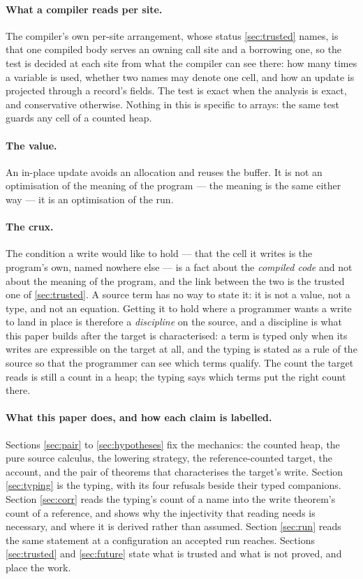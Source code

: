\documentclass[11pt,a4paper]{article}
\theoremstyle{definition}
\theoremstyle{plain}
\begin{document}
\paragraph{What a compiler reads per site.} The compiler's own per-site
arrangement, whose status \cref{sec:trusted} names, is that one compiled body
serves an owning call site and a borrowing one, so the test is decided at each
site from what the compiler can see there: how many times a variable is used,
whether two names may denote one cell, and how an update is projected through a
record's fields. The test is exact when the analysis is exact, and conservative
otherwise. Nothing in this is specific to arrays: the same test guards any cell
of a counted heap.

\paragraph{The value.} An in-place update avoids an allocation and reuses the
buffer. It is not an optimisation of the meaning of the program --- the meaning is
the same either way --- it is an optimisation of the run.

\paragraph{The crux.} The condition a write would like to hold --- that the cell it
writes is the program's own, named nowhere else --- is a fact about the
\emph{compiled code} and not about the meaning of the program, and the link
between the two is the trusted one of \cref{sec:trusted}. A source term has
no way to state it: it is not a value, not a type, and not an equation. Getting it
to hold where a programmer wants a write to land in place is therefore a
\emph{discipline} on the source, and a discipline is what this paper builds after
the target is characterised: a term is typed only when its writes are expressible
on the target at all, and the typing is stated as a rule of the source so that the
programmer can see which terms qualify. The count the target reads is still a
count in a heap; the typing says which terms put the right count there.

\paragraph{What this paper does, and how each claim is labelled.} Sections
\ref{sec:pair} to \ref{sec:hypotheses} fix the mechanics: the counted heap, the
pure source calculus, the lowering strategy, the reference-counted target, the
account, and the pair of theorems that characterises the target's write. Section
\ref{sec:typing} is the typing, with its four refusals beside their typed
companions. Section \ref{sec:corr} reads the typing's count of a name into the
write theorem's count of a reference, and shows why the injectivity that reading
needs is necessary, and where it is derived rather than assumed. Section
\ref{sec:run} reads the same statement at a configuration an accepted run reaches.
Sections \ref{sec:trusted} and \ref{sec:future} state what is trusted and what is
not proved, and place the work.
\end{document}
